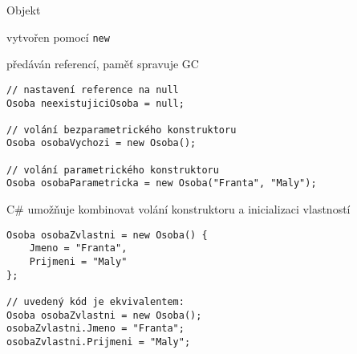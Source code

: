



\begin{frame}[fragile]
\vfill
\begin{bitemize}{Objekt}
\item vytvořen pomocí \lstinline|new|
\item předáván referencí, paměť spravuje GC
\end{bitemize}
\vfill
\begin{yesblock}
\begin{lstlisting}
// nastavení reference na null
Osoba neexistujiciOsoba = null;

// volání bezparametrického konstruktoru
Osoba osobaVychozi = new Osoba();

// volání parametrického konstruktoru
Osoba osobaParametricka = new Osoba("Franta", "Maly");
\end{lstlisting}
\end{yesblock}
\vfill
\end{frame}



\begin{frame}[fragile]
\vfill
\begin{bitemize}{}
\item C\# umožňuje kombinovat volání konstruktoru a inicializaci vlastností
\end{bitemize}
\vfill
\begin{yesblock}
\begin{lstlisting}
Osoba osobaZvlastni = new Osoba() {
	Jmeno = "Franta",
	Prijmeni = "Maly"
};

// uvedený kód je ekvivalentem:
Osoba osobaZvlastni = new Osoba();
osobaZvlastni.Jmeno = "Franta";
osobaZvlastni.Prijmeni = "Maly";
\end{lstlisting}
\end{yesblock}
\vfill
\end{frame}



